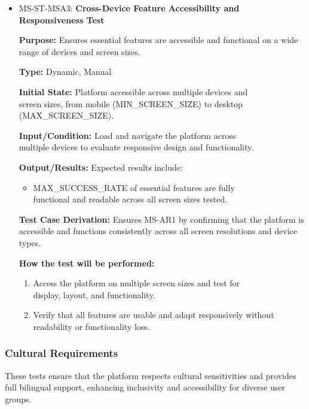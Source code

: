\documentclass[12pt, titlepage]{article}
\begin{document}
\begin{itemize}
  \item MS-ST-MSA3: \textbf{Cross-Device Feature Accessibility and Responsiveness Test}
  \begin{mdframed}[linewidth=0.5mm] 
    \textbf{Purpose:} Ensures essential features are accessible and functional on a wide range of devices and screen sizes. \par
    \textbf{Type:} Dynamic, Manual \par 
    \textbf{Initial State:} Platform accessible across multiple devices and \\screen sizes, from mobile (MIN\_SCREEN\_SIZE) to desktop \\(MAX\_SCREEN\_SIZE). \par 
    \textbf{Input/Condition:} Load and navigate the platform across \\multiple devices to evaluate responsive design and functionality. \par 
    \textbf{Output/Results:} Expected results include: 
    \begin{itemize} 
      \item MAX\_SUCCESS\_RATE of essential features are fully \\functional and readable across all screen sizes tested. 
    \end{itemize} \par
    \textbf{Test Case Derivation:} Ensures MS-AR1 by confirming that the platform is accessible and functions consistently across all screen resolutions and device types. \par
    \textbf{How the test will be performed:} 
    \begin{enumerate}[noitemsep] 
      \item Access the platform on multiple screen sizes and test for \\display, layout, and functionality. 
      \item Verify that all features are usable and adapt responsively without readability or functionality loss. 
    \end{enumerate} 
  \end{mdframed} 

\end{itemize}

\subsubsection{Cultural Requirements}

\hspace{2em}These tests ensure that the platform respects cultural sensitivities and provides full bilingual support, enhancing inclusivity and accessibility for diverse user groups.
\end{document}
